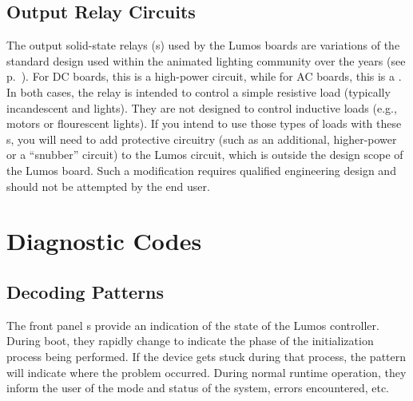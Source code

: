 \documentclass[letterpaper,twoside,onecolumn,openright,final]{memoir}
\begin{document}
\section{Output Relay Circuits}
The output solid-state relays (s) used by the Lumos boards are variations of the standard
 design used within the  animated lighting community over the years (see p.~\pageref{sec:legacy}).  For DC boards, this is a high-power  circuit, while for AC boards, this is a .
In both cases, the relay is intended to control a simple resistive load (typically incandescent and 
lights).  They are not designed to control inductive loads (e.g., motors or flourescent lights).  If you intend
to use those types of loads with these s, you will need to add protective circuitry (such as an
additional, higher-power  or a ``snubber'' circuit) to the Lumos circuit, which is outside the
design scope of the Lumos board.  Such a modification requires qualified engineering design and should not be
attempted by the end user.

%

\backmatter
\appendix

\chapter{Diagnostic Codes}
\section{Decoding  Patterns}
The front panel s provide an indication of the state of the Lumos controller.
During boot, they rapidly change to indicate the phase of the initialization process being
performed.  If the device gets stuck during that process, the  pattern will indicate
where the problem occurred.  During normal runtime operation, they inform the user of the
mode and status of the system, errors encountered, etc.
\end{document}
